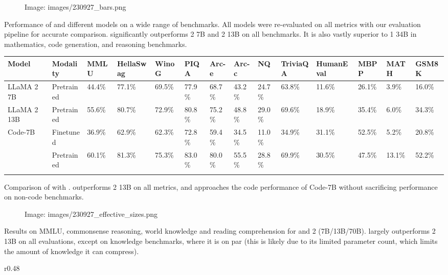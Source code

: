 \documentclass[11pt,a4paper]{article}
\begin{document}
\begin{figure}[h]
\caption{Image: images/230927\_bars.png}
\end{figure}

Performance of and different models on a wide range of benchmarks. All models were re-evaluated on all metrics with our evaluation pipeline for accurate comparison. significantly outperforms 2 7B and 2 13B on all benchmarks. It is also vastly superior to 1 34B in mathematics, code generation, and reasoning benchmarks.

\begin{table}[h]
\begin{tabular}{|l|l|l|l|l|l|l|l|l|l|l|l|l|l|}
\hline
Model & Modality & MMLU & HellaSwag & WinoG & PIQA & Arc-e & Arc-c & NQ & TriviaQA & HumanEval & MBPP & MATH & GSM8K \\ \hline
LLaMA 2 7B & Pretrained & 44.4\% & 77.1\% & 69.5\% & 77.9\% & 68.7\% & 43.2\% & 24.7\% & 63.8\% & 11.6\% & 26.1\% & 3.9\% & 16.0\% \\ \hline
LLaMA 2 13B & Pretrained & 55.6\% & 80.7\% & 72.9\% & 80.8\% & 75.2\% & 48.8\% & 29.0\% & 69.6\% & 18.9\% & 35.4\% & 6.0\% & 34.3\% \\ \hline
Code-7B & Finetuned & 36.9\% & 62.9\% & 62.3\% & 72.8\% & 59.4\% & 34.5\% & 11.0\% & 34.9\% & 31.1\% & 52.5\% & 5.2\% & 20.8\% \\ \hline
 & Pretrained & 60.1\% & 81.3\% & 75.3\% & 83.0\% & 80.0\% & 55.5\% & 28.8\% & 69.9\% & 30.5\% & 47.5\% & 13.1\% & 52.2\% \\ \hline
 &  &  &  &  &  &  &  &  &  &  &  &  &  \\ \hline
\end{tabular}
\end{table}

Comparison of with . outperforms 2 13B on all metrics, and approaches the code performance of Code-7B without sacrificing performance on non-code benchmarks.

\begin{figure}[h]
\caption{Image: images/230927\_effective\_sizes.png}
\end{figure}

Results on MMLU, commonsense reasoning, world knowledge and reading comprehension for and 2 (7B/13B/70B). largely outperforms 2 13B on all evaluations, except on knowledge benchmarks, where it is on par (this is likely due to its limited parameter count, which limits the amount of knowledge it can compress).

r0.48
\end{document}
